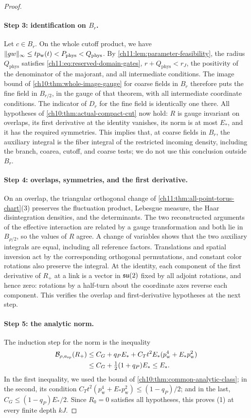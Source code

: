 \begin{proof}
\paragraph{Step 3: identification on $B_r$.}
Let $c\in B_r$. On the whole cutoff product, we have $\lVert gw\rVert_\infty\le tp_{\mathrm w}(t)<P_{\mathrm{phys}}<Q_{\mathrm{phys}}$. By \cref{ch11:lem:parameter-feasibility}, the radius $Q_{\mathrm{phys}}$ satisfies \eqref{ch11:eq:reserved-domain-gates}, $r+Q_{\mathrm{phys}}<r_J$, the positivity of the denominator of the majorant, and all intermediate conditions. The image bound of \cref{ch10:thm:whole-image-gauge} for coarse fields in $B_r$ therefore puts the fine field in $B_{r/2}$, in the gauge of that theorem, with all intermediate coordinate conditions. The indicator of $D_r$ for the fine field is identically one there. All hypotheses of \cref{ch10:thm:actual-compact-cut} now hold: $R$ is gauge invariant on overlaps, its first derivative at the identity vanishes, its norm is at most $E_*$, and it has the required symmetries. This implies that, at coarse fields in $B_r$, the auxiliary integral is the fiber integral of the restricted incoming density, including the branch, coarea, cutoff, and coarse tests; we do not use this conclusion outside $B_r$.

\paragraph{Step 4: overlaps, symmetries, and the first derivative.}
On an overlap, the triangular orthogonal change of \cref{ch11:thm:all-point-torus-chart}(3) preserves the fluctuation product, Lebesgue measure, the Haar disintegration densities, and the determinants. The two reconstructed arguments of the effective interaction are related by a gauge transformation and both lie in $B_{\rho/2}$, so the values of $R$ agree. A change of variables shows that the two auxiliary integrals are equal, including all reference factors. Translations and spatial inversion act by the corresponding orthogonal permutations, and constant color rotations also preserve the integral. At the identity, each component of the first derivative of $R_+$ at a link is a vector in $\mathfrak{su}(2)$ fixed by all adjoint rotations, and hence zero: rotations by a half-turn about the coordinate axes reverse each component. This verifies the overlap and first-derivative hypotheses at the next step.

\paragraph{Step 5: the analytic norm.}
The induction step for the norm is the inequality
\[
 \begin{split}
 \mathcal B_{\rho,a_{\mathrm{sp}}}(R_+)
 &\le C_G+q_PE_*+C_Tt^2E_*(p_{\mathrm w}^4+E_*p_{\mathrm w}^2)\\
 &\le C_G+\tfrac12(1+q_P)E_*\le E_*.
 \end{split}
\]
In the first inequality, we used the bound of \cref{ch10:thm:common-analytic-class}; in the second, its condition $C_Tt^2(p_{\mathrm w}^4+E_*p_{\mathrm w}^2)\le(1-q_P)/2$; and in the last, $C_G\le(1-q_P)E_*/2$. Since $R_0=0$ satisfies all hypotheses, this proves (1) at every finite depth $kJ$.


\end{proof}
